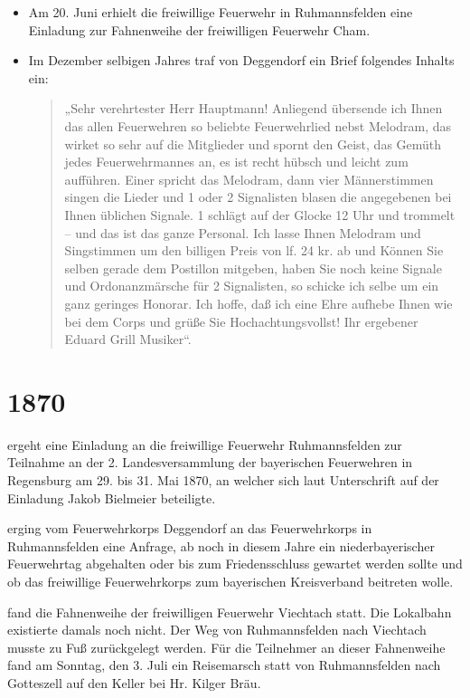 \documentclass[12pt,a4paper]{book}
\begin{document}
\begin{itemize}
\item Am 20. Juni erhielt die freiwillige Feuerwehr in Ruhmannsfelden eine Einladung
zur Fahnenweihe der freiwilligen Feuerwehr Cham.

\item Im Dezember selbigen Jahres traf von Deggendorf ein Brief folgendes Inhalts ein:

\begin{quote}
„Sehr verehrtester Herr Hauptmann! Anliegend übersende ich Ihnen das allen
Feuerwehren so beliebte Feuerwehrlied nebst Melodram, das wirket so sehr auf die
Mitglieder und spornt den Geist, das Gemüth jedes Feuerwehrmannes an, es ist
recht hübsch und leicht zum aufführen. Einer spricht das Melodram, dann vier
Männerstimmen singen die Lieder und 1 oder 2 Signalisten blasen die angegebenen
bei Ihnen üblichen Signale. 1 schlägt auf der Glocke 12 Uhr und trommelt – und
das ist das ganze Personal. Ich lasse Ihnen Melodram und Singstimmen um den
billigen Preis von lf. 24 kr. ab und Können Sie selben gerade dem Postillon
mitgeben, haben Sie noch keine Signale und Ordonanzmärsche für 2 Signalisten, so
schicke ich selbe um ein ganz geringes Honorar. Ich hoffe, daß ich eine Ehre
aufhebe Ihnen wie bei dem Corps und grüße Sie Hochachtungsvollst! Ihr ergebener
Eduard Grill Musiker“.
\end{quote}
\end{itemize}

\section*{1870}

ergeht eine Einladung an die freiwillige Feuerwehr Ruhmannsfelden zur Teilnahme
an der 2. Landesversammlung der bayerischen Feuerwehren in Regensburg am 29. bis
31. Mai 1870, an welcher sich laut Unterschrift auf der Einladung Jakob
Bielmeier beteiligte.

erging vom Feuerwehrkorps Deggendorf an das Feuerwehrkorps in Ruhmannsfelden
eine Anfrage, ab noch in diesem Jahre ein niederbayerischer Feuerwehrtag
abgehalten oder bis zum Friedensschluss gewartet werden sollte und ob das
freiwillige Feuerwehrkorps zum bayerischen Kreisverband beitreten wolle.

fand die Fahnenweihe der freiwilligen Feuerwehr Viechtach statt. Die Lokalbahn
existierte damals noch nicht. Der Weg von Ruhmannsfelden nach Viechtach musste
zu Fuß zurückgelegt werden. Für die Teilnehmer an dieser Fahnenweihe fand am
Sonntag, den 3. Juli ein Reisemarsch statt von Ruhmannsfelden nach Gotteszell
auf den Keller bei Hr. Kilger Bräu.
\end{document}
